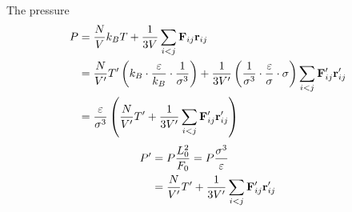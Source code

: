 The pressure
\begin{align*}
    P &= \frac{N}{V}k_B T + \frac{1}{3V} \sum_{i<j} \mathbf{F}_{ij} \mathbf{r}_{ij} \\
    &= \frac{N}{V'}T' \left(k_B \cdot \frac{\varepsilon}{k_B} \cdot \frac{1}{\sigma^3}\right) + \frac{1}{3V'} \left(\frac{1}{\sigma^3} \cdot \frac{\varepsilon}{\sigma} \cdot \sigma\right) \sum_{i<j} \mathbf{F}'_{ij} \mathbf{r}'_{ij} \\
    &= \frac{\varepsilon}{\sigma^3} \left(\frac{N}{V'}T' + \frac{1}{3V'} \sum_{i<j} \mathbf{F}'_{ij} \mathbf{r}'_{ij} \right) \\
\end{align*}
\begin{align*}
    P' &= P\frac{L_0^2}{F_0} = P\frac{\sigma^3}{\varepsilon} \\
    &= \frac{N}{V'}T' + \frac{1}{3V'} \sum_{i<j} \mathbf{F}'_{ij} \mathbf{r}'_{ij} \\
\end{align*}
